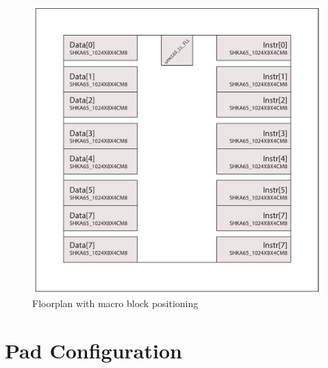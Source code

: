 \begin{figure}[h]
  \centering
  \includegraphics[width=\linewidth]{./figures/floorplan}
  \caption{Floorplan with macro block positioning}
  \label{fig:floorplan}
\end{figure}

\section{Pad Configuration}

